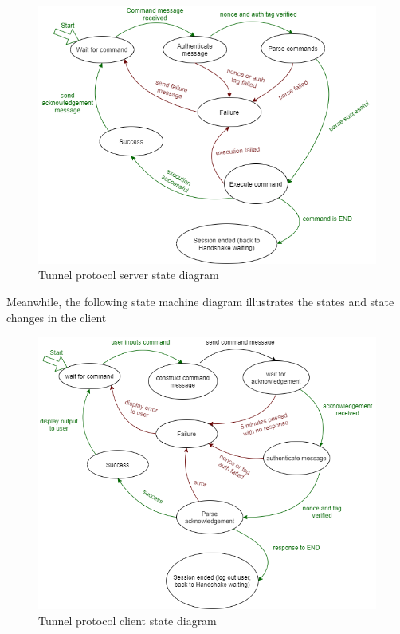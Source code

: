 \documentclass[12pt]{article}
\begin{document}
\begin{figure}[H]
    \centering
    \includegraphics[width=\textwidth]{Tunnel_State_Diagram_Server}
    \caption{Tunnel protocol server state diagram}
    \label{fig:tunnel_msc}
\end{figure}

\noindent Meanwhile, the following state machine diagram illustrates the states and state changes in the client

\begin{figure}[H]
    \centering
    \includegraphics[width=\textwidth]{Tunnel_State_Diagram_Client}
    \caption{Tunnel protocol client state diagram}
    \label{fig:tunnel_msc}
\end{figure}
\end{document}
